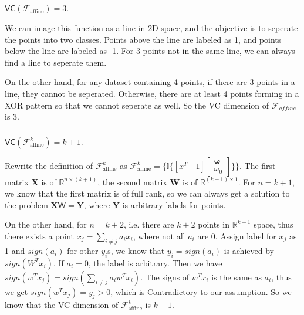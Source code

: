 \documentclass[12pt]{article}
\begin{document}
\subsection{}
\subsubsection{}
$\mathsf{V} \mathsf{C} (\mathcal{F} _{\text{affine}}) = 3$.

We can image this function as a line in 2D space, and the objective is to seperate the points into two classes. Points above the line are labeled as 1, and points below the line are labeled as -1. For 3 points not in the same line, we can always find a line to seperate them. 

On the other hand, for any dataset containing 4 points, if there are 3 points in a line, they cannot be seperated. Otherwise, there are at least 4 points forming in a XOR pattern so that we cannot seperate as well. So the VC dimension of $\mathcal{F} _{affine}$ is 3.

\subsubsection{}
$\mathsf{V} \mathsf{C} (\mathcal{F}^{k} _{\text{affine}}) = k+1$.

Rewrite the definition of $\mathcal{F}^{k} _{\text{affine}}$ as $\mathcal{F}^{k} _{\text{affine}} = \{ \mathbb{I} \{ \left [ x^T \quad 1 \right ]  \begin{bmatrix} \mathbf{\omega}\\\omega_0 \end{bmatrix}  \}\}$.
The first matrix $\mathbf{X} $ is of $\mathbb{R} ^{n\times( k+1 ) }$, the second matrix $\mathbf{W} $ is of $\mathbb{R} ^{(k+1)\times 1}$. 
For $n=k+1$, we know that the first matrix is of full rank, so we can always get a solution to the problem $\mathbf{X} \mathsf{W} = \mathbf{Y} $, where $\mathbf{Y} $ is arbitrary labels for points.

On the other hand, for $n = k+2$, i.e. there are $k+2$ points in $\mathbb{R}^{k+1}$ space, thus there exists a point $x_j = \sum_{i\ne j} a_{i}x_{i}$, where not all $a_{i}$ are $0$. Assign label for $x_j$ as 1 and $sign(a_i)$ for other $y_i$s, we know that $y_{i} = sign(a_{i})$ is achieved by $sign (W^T x_{i})$. If $a_i = 0$, the label is arbitrary.
Then we have $sign(w^Tx_{j}) = sign(\sum_{i \ne j}a_{i}w^Tx_{i})$. The signs of $w^Tx_{i}$ is the same as $a_{i}$, thus we get $sign(w^Tx_{j}) = y_{j} > 0$, which is Contradictory to our assumption. So we know that the VC dimension of $\mathcal{F}^{k} _{\text{affine}}$ is $k+1$.
\end{document}

